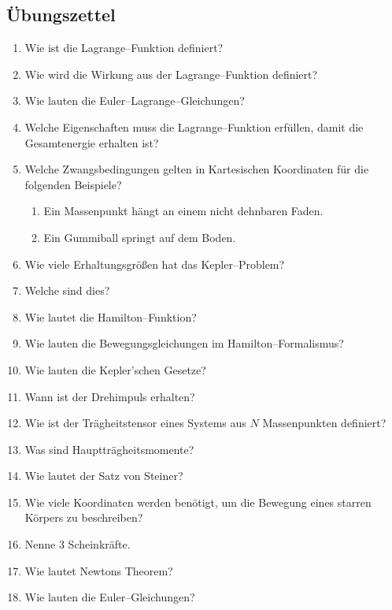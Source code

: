 \documentclass[a4paper,12pt]{article}
\numberwithin{equation}{section}
\begin{document}
\subsection{Übungszettel}
\begin{enumerate}[label=\arabic*.]
        \item Wie ist die Lagrange--Funktion definiert?
        \item Wie wird die Wirkung aus der Lagrange--Funktion definiert?
        \item Wie lauten die Euler--Lagrange--Gleichungen?
        \item Welche Eigenschaften muss die Lagrange--Funktion erfüllen, damit die Gesamtenergie erhalten ist?
        \item Welche Zwangsbedingungen gelten in Kartesischen Koordinaten für die folgenden Beispiele?
                \begin{enumerate}[label=\alph*)]
                        \item Ein Massenpunkt hängt an einem nicht dehnbaren Faden.
                        \item Ein Gummiball springt auf dem Boden.
                \end{enumerate}
        \item Wie viele Erhaltungsgrößen hat das Kepler--Problem?
        \item Welche sind dies?
        \item Wie lautet die Hamilton--Funktion?
        \item Wie lauten die Bewegungsgleichungen im Hamilton--Formalismus?
        \item Wie lauten die Kepler'schen Gesetze?
        \item Wann ist der Drehimpuls erhalten?
        \item Wie ist der Trägheitstensor eines Systems aus $N$ Massenpunkten definiert?
        \item Was sind Hauptträgheitsmomente?
        \item Wie lautet der Satz von Steiner?
        \item Wie viele Koordinaten werden benötigt, um die Bewegung eines starren Körpers zu beschreiben?
        \item Nenne 3 Scheinkräfte.
        \item Wie lautet Newtons Theorem?
        \item Wie lauten die Euler--Gleichungen?
\end{enumerate}
\end{document}
